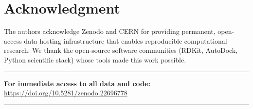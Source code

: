 \documentclass[11pt,a4paper]{article}
\begin{document}
\section*{Acknowledgment}

The authors acknowledge Zenodo and CERN for providing permanent, open-access data hosting infrastructure that enables reproducible computational research. We thank the open-source software communities (RDKit, AutoDock, Python scientific stack) whose tools made this work possible.

\vspace{1em}

\noindent\rule{\textwidth}{0.4pt}

\begin{center}
\textbf{For immediate access to all data and code:} \\[0.5em]
\Large\url{https://doi.org/10.5281/zenodo.22696778}
\end{center}

\noindent\rule{\textwidth}{0.4pt}
\end{document}
